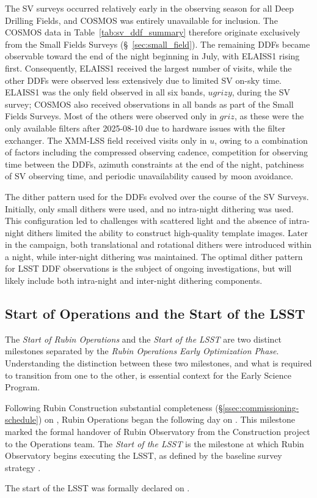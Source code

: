The SV surveys occurred relatively early in the observing season for all Deep Drilling Fields, and COSMOS was entirely unavailable for inclusion.
The COSMOS data in Table~\ref{tab:sv_ddf_summary} therefore originate exclusively from the Small Fields Surveys (\S~\ref{sec:small_field}).
The remaining DDFs became observable toward the end of the night beginning in July, with ELAISS1 rising first.
Consequently, ELAISS1 received the largest number of visits, while the other DDFs were observed less extensively due to limited SV on-sky time.
ELAISS1 was the only field observed in all six bands, $ugrizy$, during the SV survey; COSMOS also received observations in all bands as part of the Small Fields Surveys.
Most of the others were observed only in $griz$, as these were the only available filters after 2025-08-10 due to hardware issues with the filter exchanger.
The XMM-LSS field received visits only in $u$, owing to a combination of factors including the compressed observing cadence, competition for  observing time between the DDFs, azimuth constraints at the end of the night, patchiness of SV observing time, and periodic unavailability caused by moon avoidance.

The dither pattern used for the DDFs evolved over the course of the SV Surveys.
Initially, only small dithers were used, and no intra-night dithering was used.
This configuration led to challenges with scattered light and the absence of intra-night dithers limited the ability to construct high-quality template images.
Later in the campaign, both translational and rotational dithers were introduced within a night, while inter-night dithering was maintained.
The optimal dither pattern for LSST DDF observations is the subject of ongoing investigations,  but will likely include both intra-night and inter-night dithering components.

\subsection{Start of Operations and the Start of the LSST}
\label{ssec:ops-lsst-start}


The \textit{Start of Rubin Operations} and the \textit{Start of the LSST} are two distinct milestones separated by the \textit{Rubin Operations Early Optimization Phase}.
Understanding the distinction between these two milestones, and what is required to transition from one to the other, is essential context for the Early Science Program.

Following Rubin Construction substantial completeness (\S\ref{ssec:commissioning-schedule}) on \cstrcompdate, Rubin Operations began the following day on \opsstartdate.
This milestone marked the formal handover of Rubin Observatory from the Construction project to the Operations team.
The \textit{Start of the LSST} is the milestone at which Rubin Observatory begins executing the LSST, as defined by the baseline survey strategy \citep[][]{PSTN-056}.

The start of the LSST was formally declared on \lsststartdate.


